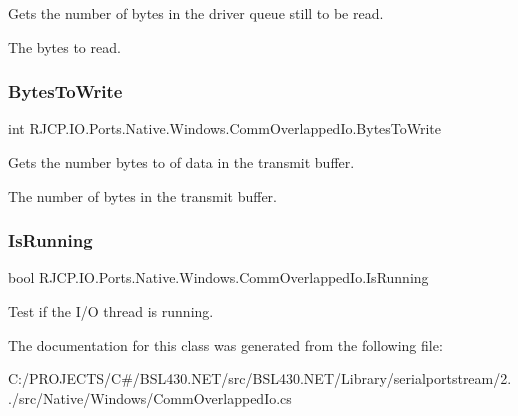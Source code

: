 Gets the number of bytes in the driver queue still to be read. 

The bytes to read. \mbox{\label{class_r_j_c_p_1_1_i_o_1_1_ports_1_1_native_1_1_windows_1_1_comm_overlapped_io_a9353014aa124290bee2df248c033789a}} 
\subsubsection{\texorpdfstring{BytesToWrite}{BytesToWrite}}
{\footnotesize\ttfamily int R\+J\+C\+P.\+I\+O.\+Ports.\+Native.\+Windows.\+Comm\+Overlapped\+Io.\+Bytes\+To\+Write\hspace{0.3cm}{\ttfamily [get]}}



Gets the number bytes to of data in the transmit buffer. 

The number of bytes in the transmit buffer. \mbox{\label{class_r_j_c_p_1_1_i_o_1_1_ports_1_1_native_1_1_windows_1_1_comm_overlapped_io_aa6fd1bdb14e71409f4f3662c6b2477a4}} 
\subsubsection{\texorpdfstring{IsRunning}{IsRunning}}
{\footnotesize\ttfamily bool R\+J\+C\+P.\+I\+O.\+Ports.\+Native.\+Windows.\+Comm\+Overlapped\+Io.\+Is\+Running\hspace{0.3cm}{\ttfamily [get]}}



Test if the I/O thread is running. 



The documentation for this class was generated from the following file\+:\begin{DoxyCompactItemize}
\item 
C\+:/\+P\+R\+O\+J\+E\+C\+T\+S/\+C\#/\+B\+S\+L430.\+N\+E\+T/src/\+B\+S\+L430.\+N\+E\+T/\+Library/serialportstream/2../src/\+Native/\+Windows/Comm\+Overlapped\+Io.\+cs\end{DoxyCompactItemize}
